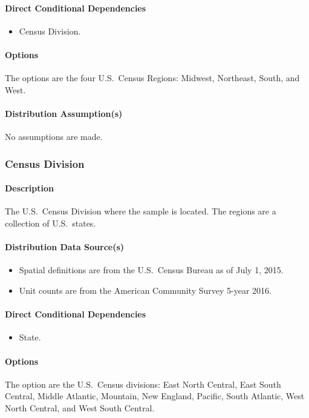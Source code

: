 \paragraph{Direct Conditional Dependencies}
\begin{itemize} 
\item Census Division.
\end{itemize}

\paragraph{Options}
The options are the four U.S.~Census Regions: Midwest, Northeast, South, and West.

\paragraph{Distribution Assumption(s)}
No assumptions are made.

\subsubsection{Census Division}
\paragraph{Description}
The U.S.~Census Division where the sample is located. The regions are a collection of U.S.~states.

\paragraph{Distribution Data Source(s)}
\begin{itemize} 
\item
  Spatial definitions are from the U.S.~Census Bureau as of July 1,
  2015.
\item
  Unit counts are from the American Community Survey 5-year 2016.
\end{itemize}

\paragraph{Direct Conditional Dependencies}
\begin{itemize} 
\item State.
\end{itemize}

\paragraph{Options}
The option are the U.S.~Census divisions: East North Central, East South Central, Middle Atlantic, Mountain, New England, Pacific, South Atlantic, West North Central, and West South Central.

